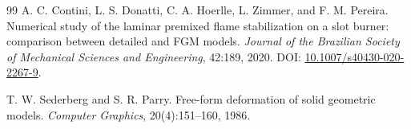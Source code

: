 \documentclass{iopconfser}
\begin{document}
\begin{thebibliography}{99}
\newblock A. C. Contini, L. S. Donatti, C. A. Hoerlle, L. Zimmer, and F. M. Pereira.
\newblock Numerical study of the laminar premixed flame stabilization on a slot burner: comparison between detailed and FGM models.
\newblock \emph{Journal of the Brazilian Society of Mechanical Sciences and Engineering}, 42:189, 2020.
\newblock DOI: \href{https://doi.org/10.1007/s40430-020-2267-9}{10.1007/s40430-020-2267-9}.

\newblock T. W. Sederberg and S. R. Parry.
\newblock Free-form deformation of solid geometric models.
\newblock \emph{Computer Graphics}, 20(4):151--160, 1986.

\end{thebibliography}
\end{document}
